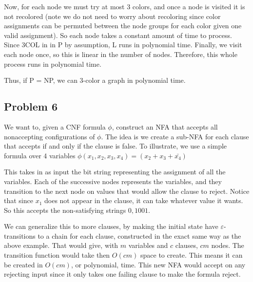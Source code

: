 \documentclass[english]{article}
\begin{document}
Now, for each node we must try at most 3 colors, and once a node is visited it is not recolored (note
we do not need to worry about recoloring since color assignments can be permuted between the node
groups for each color given one valid assignment). So each node takes a constant amount of time to
process. Since 3COL in in P by assumption, L runs in polynomial time. Finally, we visit each node
once, so this is linear in the number of nodes. Therefore, this whole process runs in polynomial time.

Thus, if P = NP, we can 3-color a graph in polynomial time.

\subsection*{Problem 6}
We want to, given a CNF formula $\phi$, construct an NFA that accepts all nonaccepting configurations of $\phi$.
The idea is we create a sub-NFA for each clause that accepts if and only if the clause is false. To illustrate,
we use a simple formula over 4 variables $\phi(x_1,x_2,x_3,x_4) = (x_2 + x_3 + \bar{x_4})$


This takes in as input the bit string representing the assignment of all the variables. Each of the successive nodes
represents the variables, and they transition to the next node on values that would allow the clause to reject.
Notice that since $x_1$ does not appear in the clause, it can take whatever value it wants. So this accepts
the non-satisfying strings ${0,1}001$. 

We can generalize this to more clauses, by making the initial state have $\varepsilon$-transitions 
to a chain for each clause, constructed in the exact same way as the above example. That would
give, with $m$ variables and $c$ clauses, $cm$ nodes. The transition function would take then
$O(cm)$ space to create. This means it can be created in $O(cm)$, or polynomial, time.
This new NFA would accept on any rejecting input since it only takes one failing clause to make the formula
reject. 
\end{document}
